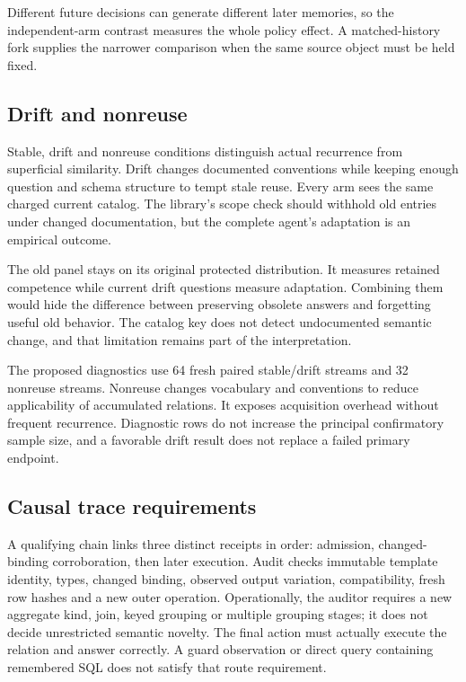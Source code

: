 \documentclass[10pt,twocolumn]{article}
\begin{document}
Different future decisions can generate different later memories, so the
independent-arm contrast measures the whole policy effect. A matched-history
fork supplies the narrower comparison when the same source object must be
held fixed.

\subsection{Drift and nonreuse}
Stable, drift and nonreuse conditions distinguish actual recurrence from
superficial similarity. Drift changes documented conventions while keeping
enough question and schema structure to tempt stale reuse. Every arm sees the
same charged current catalog. The library's scope check should withhold old
entries under changed documentation, but the complete agent's adaptation is an
empirical outcome.

The old panel stays on its original protected distribution. It measures retained
competence while current drift questions measure adaptation. Combining them
would hide the difference between preserving obsolete answers and forgetting
useful old behavior. The catalog key does not detect undocumented semantic
change, and that limitation remains part of the interpretation.

The proposed diagnostics use 64 fresh paired stable/drift streams and 32 nonreuse
streams. Nonreuse changes vocabulary and conventions to reduce applicability of
accumulated relations. It exposes acquisition overhead without frequent
recurrence. Diagnostic rows do not increase the principal confirmatory sample
size, and a favorable drift result does not replace a failed primary endpoint.

\subsection{Causal trace requirements}
A qualifying chain links three distinct receipts in order: admission,
changed-binding corroboration, then later execution. Audit checks immutable
template identity, types, changed binding, observed output variation,
compatibility, fresh row hashes and a new outer operation. Operationally, the
auditor requires a new aggregate kind, join, keyed grouping or multiple grouping
stages; it does not decide unrestricted semantic novelty. The final action must
actually execute the relation and answer correctly. A guard observation or
direct query containing remembered SQL does not satisfy that route requirement.
\end{document}
